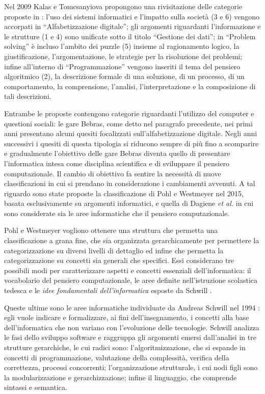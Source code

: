 \documentclass[12pt]{report}
\begin{document}
Nel 2009 Kalas e Tomcsanyiova \cite{KalasIFIP2009} propongono una rivisitazione delle categorie proposte in \cite{DagieneISEEP2008}: l'uso dei sistemi informatici e l'impatto sulla società (3 e 6) vengono accorpati in ``Alfabetizzazione digitale''; gli argomenti riguardanti l'informazione e le strutture (1 e 4) sono unificate sotto il titolo ``Gestione dei dati''; in ``Problem solving''  è incluso l'ambito dei puzzle (5) insieme al ragionamento logico, la giustificazione, l'argomentazione, le strategie per la risoluzione dei problemi; infine all'interno di ``Programmazione'' vengono inseriti il tema del pensiero algoritmico (2), la descrizione formale di una soluzione, di un processo, di un comportamento, la comprensione, l'analisi, l'interpretazione e la composizione di tali descrizioni. 
 
Entrambe le proposte contengono categorie riguardanti l'utilizzo del computer e questioni sociali: le gare Bebras, come detto nel paragrafo precedente, nei primi anni presentano alcuni quesiti focalizzati sull'alfabetizzazione digitale. Negli anni successivi i quesiti di questa tipologia si riducono sempre di più fino a scomparire e gradualmente l'obiettivo delle gare Bebras diventa quello di presentare l'informatica intesa come disciplina scientifica e di sviluppare il pensiero computazionale. 
Il cambio di obiettivo fa sentire la necessità di nuove classificazioni in cui si prendano in considerazione i cambiamenti avvenuti. A tal riguardo sono state proposte la classificazione di Pohl e Westmeyer \cite{PohlLNCS2015} nel 2015, basata esclusivamente su argomenti informatici, e quella di Dagiene \textit{et al.} \cite{DagieneINFORMATICA2017} in cui sono considerate sia le aree informatiche che il pensiero computazionale.

Pohl e Westmeyer \cite{PohlLNCS2015} vogliono ottenere una struttura che permetta una classificazione a grana fine, che sia organizzata gerarchicamente per permettere la categorizzazione su diversi livelli di dettaglio ed infine che permetta la categorizzazione su concetti sia generali che specifici.
Essi considerano tre possibili modi per caratterizzare aspetti e concetti essenziali dell'informatica: il vocabolario del pensiero computazionale, le aree definite nell'istruzione scolastica tedesca e le \textit{idee fondamentali dell'informatica} esposte da Schwill \cite{SchwillEATCS1994}.

Queste ultime sono le aree informatiche individuate da Andreas Schwill nel 1994 \cite{SchwillEATCS1994}: egli vuole indicare e formalizzare, ai fini dell'insegnamento, i concetti alla base dell'informatica che non variano con l'evoluzione delle tecnologie.
Schwill analizza le fasi dello sviluppo software e raggruppa gli argomenti emersi dall'analisi in tre strutture gerarchiche, le cui radici sono: l'algoritmizzazione, che si espande in concetti di programmazione, valutazione della complessità, verifica della correttezza, processi concorrenti; l'organizzazione strutturale, i cui nodi figli sono la modularizzazione e gerarchizzazione; infine il linguaggio, che comprende sintassi e semantica.
\end{document}
